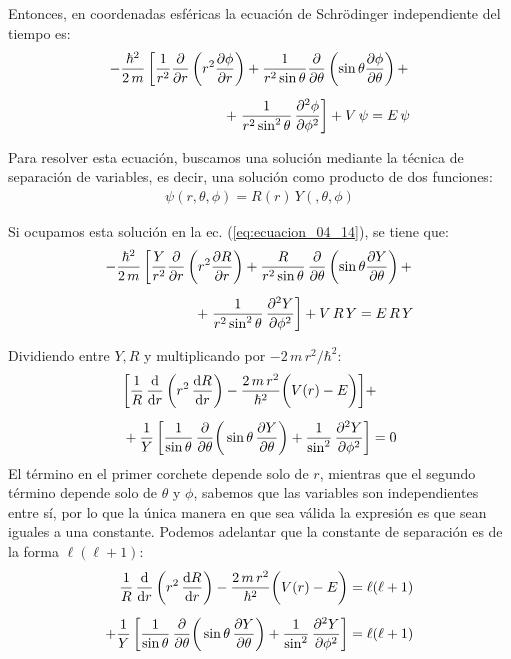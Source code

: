 Entonces, en coordenadas esféricas la ecuación de Schrödinger independiente del tiempo es:
\begin{align}
- \dfrac{\hbar^{2}}{2 \, m}  \left[ \dfrac{1}{r^{2}} \pdv{r} \left( r^{2} \pdv{\phi}{r} \right) + \dfrac{1}{r^{2} \sin \theta} \pdv{\theta} \left( \sin \theta \pdv{\phi}{\theta} \right) + \right. \nonumber \\[0.5em]
+ \left. \dfrac{1}{r^{2} \sin^{2} \theta} \, \pdv[2]{\phi}{\phi} \right] + V \, \psi = E \, \psi
\label{eq:ecuacion_04_14}
\end{align}

Para resolver esta ecuación, buscamos una solución mediante la técnica de separación de variables, es decir, una solución como producto de dos funciones:
\begin{align}
\psi(r, \theta, \phi) = R(r) \, Y(,\theta, \phi)
\label{eq:ecuacion_04_15}
\end{align}

Si ocupamos esta solución en la ec. (\ref{eq:ecuacion_04_14}), se tiene que:
\begin{align*}
- \dfrac{\hbar^{2}}{2 \, m}  \left[ \dfrac{Y}{r^{2}} \pdv{r} \left( r^{2} \pdv{R}{r} \right) + \dfrac{R}{r^{2} \sin \theta} \, \pdv{\theta} \left( \sin \theta \pdv{Y}{\theta} \right) + \right. \nonumber \\[0.5em]
+ \left. \dfrac{1}{r^{2} \sin^{2} \theta} \, \pdv[2]{Y}{\phi} \right] + V \, R \, Y = E \, R \, Y
\end{align*}

Dividiendo entre $Y , R$ y multiplicando por $-2 \, m \, r^{2} / \hbar^{2}$:
\begin{align*}
&\bigg[ \dfrac{1}{R} \, \dv{r} \left( r^{2} \, \dv{R}{r} \right) - \dfrac{2 \, m \, r^{2}}{\hbar^{2}} \bigg( V(r) - E \bigg) \bigg] + \\[0.5em]
&+ \dfrac{1}{Y} \left[ \dfrac{1}{\sin \theta} \, \pdv{\theta} \bigg( \sin \theta \, \pdv{Y}{\theta} \bigg) + \dfrac{1}{\sin^{2}} \, \pdv[2]{Y}{\phi} \right] = 0
\end{align*}
El término en el primer corchete depende solo de $r$, mientras que el segundo término depende solo de $\theta$ y $\phi$, sabemos que las variables son independientes entre sí, por lo que la única manera en que sea válida la expresión es que sean iguales a una constante. Podemos adelantar que la constante de separación es de la forma $\ell(\ell + 1)$:
\begin{align}
\dfrac{1}{R} \, \dv{r} \left( r^{2} \, \dv{R}{r} \right) - \dfrac{2 \, m \, r^{2}}{\hbar^{2}} \bigg( V(r) - E \bigg) &= \ell (\ell + 1) \label{eq:ecuacion_04_16} \\[0.5em]
+ \dfrac{1}{Y} \left[ \dfrac{1}{\sin \theta} \, \pdv{\theta} \bigg( \sin \theta \, \pdv{Y}{\theta} \bigg) + \dfrac{1}{\sin^{2}} \, \pdv[2]{Y}{\phi} \right] &= \ell (\ell + 1) \label{eq:ecuacion_04_17}    
\end{align}

